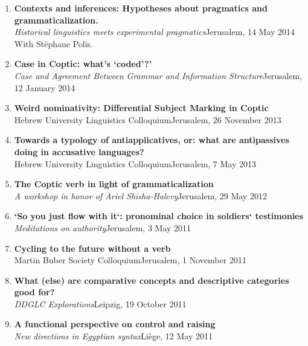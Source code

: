\documentclass[letterpaper,11pt]{article}
\begin{document}
\begin{enumerate}[resume]
\item \textbf{Contexts and inferences: Hypotheses about pragmatics and grammaticalization.}\\
\textit{Historical linguistics meets experimental pragmatics}\hfill{Jerusalem, 14 May 2014}\\
With St\"ephane Polis.

\item {\textbf{Case in Coptic: what’s ‘coded’?’}}\\\textit{Case and Agreement Between Grammar and Information Structure}\hfill{Jerusalem, 12 January 2014}

\item \textbf{Weird nominativity: Differential Subject Marking in Coptic}\\Hebrew University Linguistics Colloquium\hfill{Jerusalem, 26 November 2013}

\item \textbf{Towards a typology of antiapplicatives, or: what are antipassives doing in accusative languages?}\\
Hebrew University Linguistics Colloquium\hfill{Jerusalem, 7 May 2013}

\item \textbf{The Coptic verb in light of grammaticalization}\\
\textit{A workshop in honor of Ariel Shisha-Halevy}\hfill{Jerusalem, 29 May 2012}\\

\item \textbf{`So you just flow with it`: pronominal choice in soldiers` testimonies}\\
\textit{Meditations on authority}\hfill{Jerusalem, 3 May 2011}

\item \textbf{Cycling to the future without a verb}\\
Martin Buber Society Colloquium\hfill{Jerusalem, 1 November 2011}

\item \textbf{What (else) are comparative concepts and descriptive categories good for?}\\
\textit{DDGLC Explorations}\hfill{Leipzig, 19 October 2011}

\item \textbf{A functional perspective on control and raising}\\ \textit{New directions in Egyptian syntax}\hfill{Li\`{e}ge, 12 May 2011}


\end{enumerate}
\end{document}
